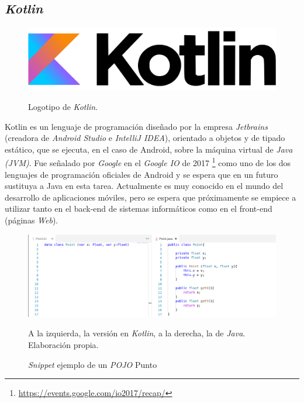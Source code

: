 \documentclass[twoside]{report}
\begin{document}
\subsection{\textit{Kotlin}}

\begin{figure}[H]
\centering
\includegraphics[scale=0.3]{images/kotlin}\\
\caption{Logotipo de \textit{Kotlin}.} \cite{kotlin}
\end{figure}

Kotlin\cite{smovkotlin} es un lenguaje de programación diseñado por la empresa \textit{Jetbrains} (creadora de \textit{Android Studio} e \textit{IntelliJ IDEA}), orientado a objetos y de tipado estático, que se ejecuta, en el caso de Android, sobre la máquina virtual de \textit{Java (JVM)}. Fue señalado por \textit{Google} en el \textit{Google IO} de 2017 \footnote{\url{https://events.google.com/io2017/recap/}} como uno de los dos lenguajes de programación oficiales de Android y se espera que en un futuro sustituya a Java en esta tarea. Actualmente es muy conocido en el mundo del desarrollo de aplicaciones móviles, pero se espera que próximamente se empiece a utilizar tanto en el back-end de sistemas informáticos como en el front-end (páginas \textit{Web}).


\begin{figure}[H]
\centering
\includegraphics[width=\textwidth]{images/kotlinexample}\\
\caption{\textit{Snippet} ejemplo de un \textit{POJO} Punto} A la izquierda, la versión en \textit{Kotlin}, a la derecha, la de \textit{Java}. Elaboración propia.
\end{figure}
\end{document}
